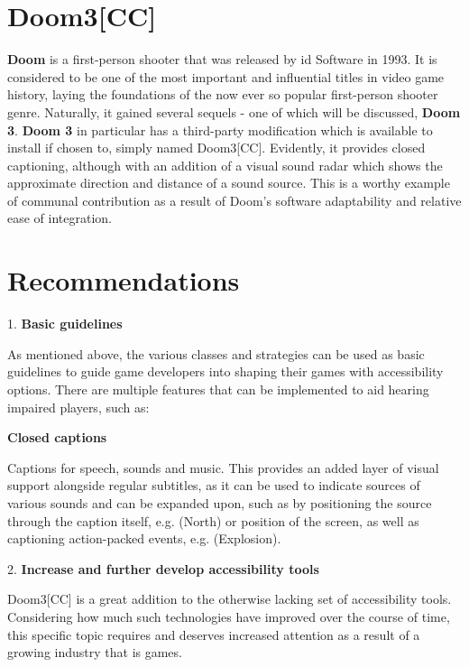 \documentclass{scrartcl}
\begin{document}
\section{Doom3[CC]}
\textbf{Doom} is a first-person shooter that was released by id Software in 1993. It is considered to be one of the most important and influential titles in video game history, laying the foundations of the now ever so popular first-person shooter genre. Naturally, it gained several sequels - one of which will be discussed, \textbf{Doom 3}. \textbf{Doom 3} in particular has a third-party modification which is available to install if chosen to, simply named Doom3[CC]. Evidently, it provides closed captioning, although with an addition of a visual sound radar which shows the approximate direction and distance of a sound source. This is a worthy example of communal contribution as a result of Doom's software adaptability and relative ease of integration. 


\section{Recommendations}


\hspace{6mm}1.	\textbf{Basic guidelines}

\hspace{-4mm}As mentioned above, the various classes and strategies can be used as basic guidelines to guide game developers into shaping their games with accessibility options. There are multiple features that can be implemented to aid hearing impaired players, such as:

\hspace{-4mm}\textbf{Closed captions}

\hspace{-4mm}Captions for speech, sounds and music. This provides an added layer of visual support alongside regular subtitles, as it can be used to indicate sources of various sounds and can be expanded upon, such as by positioning the source through the caption itself, e.g. (North) or position of the screen, as well as captioning action-packed events, e.g. (Explosion). \cite{Yuan}

2.	\textbf{Increase and further develop accessibility tools}

\hspace{-4mm}Doom3[CC] is a great addition to the otherwise lacking set of accessibility tools. Considering how much such technologies have improved over the course of time, this specific topic requires and deserves increased attention as a result of a growing industry that is games. \cite{Fromme} 
\end{document}
